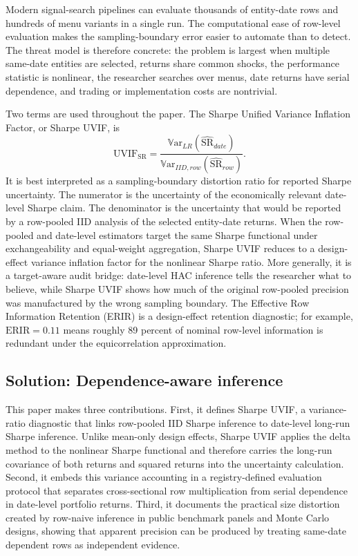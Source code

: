 \documentclass[12pt,a4paper]{article}
\newcommand{\Var}{\mathbb{V}\mathrm{ar}}
\newcommand{\SR}{\mathrm{SR}}
\newcommand{\UVIF}{\mathrm{UVIF}}
\begin{document}
Modern signal-search pipelines can evaluate thousands of entity-date
rows and hundreds of menu variants in a single run.  The computational
ease of row-level evaluation makes the sampling-boundary error easier to
automate than to detect.  The threat model is therefore concrete: the
problem is largest when multiple same-date entities are selected,
returns share common shocks, the performance statistic is nonlinear, the
researcher searches over menus, date returns have serial dependence, and
trading or implementation costs are nontrivial.

Two terms are used throughout the paper.  The Sharpe Unified Variance
Inflation Factor, or Sharpe UVIF, is
\[
  \UVIF_{\SR}
  =
  \frac{\Var_{LR}(\widehat{\SR}_{date})}
       {\Var_{IID,row}(\widehat{\SR}_{row})}.
\]
It is best interpreted as a sampling-boundary distortion ratio for
reported Sharpe uncertainty.  The numerator is the uncertainty of the
economically relevant date-level Sharpe claim.  The denominator is the
uncertainty that would be reported by a row-pooled IID analysis of the
selected entity-date returns.  When the row-pooled and date-level
estimators target the same Sharpe functional under exchangeability and
equal-weight aggregation, Sharpe UVIF reduces to a design-effect
variance inflation factor for the nonlinear Sharpe ratio.  More
generally, it is a target-aware audit bridge: date-level HAC inference
tells the researcher what to believe, while Sharpe UVIF shows how much
of the original row-pooled precision was manufactured by the wrong
sampling boundary.  The Effective Row Information Retention (ERIR) is a
design-effect retention diagnostic; for example, \(\mathrm{ERIR}=0.11\)
means roughly 89 percent of nominal row-level information is redundant
under the equicorrelation approximation.

\subsection{Solution: Dependence-aware inference}

This paper makes three contributions.  First, it defines Sharpe UVIF, a
variance-ratio diagnostic that links row-pooled IID Sharpe inference to
date-level long-run Sharpe inference.  Unlike mean-only design effects,
Sharpe UVIF applies the delta method to the nonlinear Sharpe functional
and therefore carries the long-run covariance of both returns and
squared returns into the uncertainty calculation.  Second, it embeds this
variance accounting in a registry-defined evaluation protocol that
separates cross-sectional row multiplication from serial dependence in
date-level portfolio returns.  Third, it documents the practical size
distortion created by row-naive inference in public benchmark panels and
Monte Carlo designs, showing that apparent precision can be produced by
treating same-date dependent rows as independent evidence.
\end{document}
